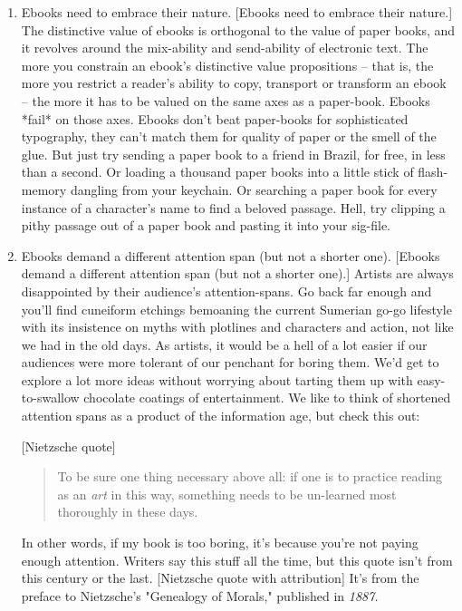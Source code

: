 \begin{enumerate}
\item
  Ebooks need to embrace their nature. [Ebooks need to embrace their
  nature.] The distinctive value of ebooks is orthogonal to the value
  of paper books, and it revolves around the mix-ability and
  send-ability of electronic text. The more you constrain an ebook's
  distinctive value propositions -- that is, the more you restrict a
  reader's ability to copy, transport or transform an ebook -- the
  more it has to be valued on the same axes as a paper-book. Ebooks
  *fail* on those axes. Ebooks don't beat paper-books for
  sophisticated typography, they can't match them for quality of
  paper or the smell of the glue. But just try sending a paper book
  to a friend in Brazil, for free, in less than a second. Or loading
  a thousand paper books into a little stick of flash-memory dangling
  from your keychain. Or searching a paper book for every instance of
  a character's name to find a beloved passage. Hell, try clipping a
  pithy passage out of a paper book and pasting it into your
  sig-file.
\item
  Ebooks demand a different attention span (but not a shorter one).
  [Ebooks demand a different attention span (but not a shorter one).]
  Artists are always disappointed by their audience's
  attention-spans. Go back far enough and you'll find cuneiform
  etchings bemoaning the current Sumerian go-go lifestyle with its
  insistence on myths with plotlines and characters and action, not
  like we had in the old days. As artists, it would be a hell of a
  lot easier if our audiences were more tolerant of our penchant for
  boring them. We'd get to explore a lot more ideas without worrying
  about tarting them up with easy-to-swallow chocolate coatings of
  entertainment. We like to think of shortened attention spans as a
  product of the information age, but check this out:
  
  [Nietzsche quote]
  
  \begin{quote}
    To be sure one thing necessary above all: if one is to practice
    reading as an \emph{art} in this way, something needs to be
    un-learned most thoroughly in these days.
  \end{quote}

  In other words, if my book is too boring, it's because you're not
  paying enough attention. Writers say this stuff all the time, but
  this quote isn't from this century or the last. [Nietzsche quote
  with attribution] It's from the preface to Nietzsche's "Genealogy
  of Morals," published in \emph{1887.}
  

\end{enumerate}
